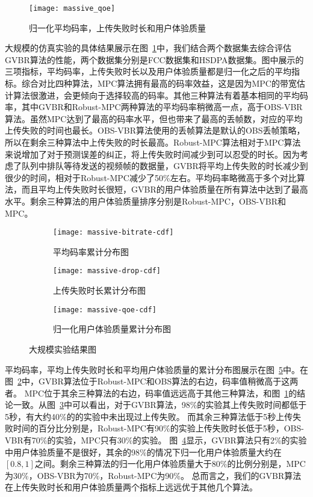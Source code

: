 \begin{figure}[tb]%
  \centering
  \texttt{[image: massive\_qoe]}
  \caption{归一化平均码率，上传失败时长和用户体验质量}
  \label{fig:massive_qoe}
\end{figure}

大规模的仿真实验的具体结果展示在图~\ref{fig:massive_qoe}中，我们结合两个数据集去综合评估GVBR算法的性能，两个数据集分别是FCC数据集和HSDPA数据集。图中展示的三项指标，平均码率，上传失败时长以及用户体验质量都是归一化之后的平均指标。综合对比四种算法，MPC算法拥有最高的码率效益，这是因为MPC的带宽估计算法很激进，会更倾向于选择较高的码率。其他三种算法有着基本相同的平均码率，其中GVBR和Robust-MPC两种算法的平均码率稍微高一点，高于OBS-VBR算法。虽然MPC达到了最高的码率水平，但也带来了最高的丢帧数，对应的平均上传失败的时间也最长。OBS-VBR算法使用的丢帧算法是默认的OBS丢帧策略，所以在剩余三种算法中上传失败的时长最高。Robust-MPC算法相对于MPC算法来说增加了对于预测误差的纠正，将上传失败时间减少到可以忍受的时长。因为考虑了队列中排队等待发送的视频帧的数据量，GVBR将平均上传失败的时长减少到很少的时间，相对于Robust-MPC减少了50\%左右。平均码率略微高于多个对比算法，而且平均上传失败时长很短，GVBR的用户体验质量在所有算法中达到了最高水平。剩余三种算法的用户体验质量排序分别是Robust-MPC，OBS-VBR和MPC。

\begin{figure}[tb]
  \centering%
  \begin{subfigure}{0.48\textwidth}
    \texttt{[image: massive-bitrate-cdf]}
    \caption{平均码率累计分布图}
    \label{fig:bitrate_cdf}
  \end{subfigure}%
  \hfill
  \begin{subfigure}{0.48\textwidth}
    \texttt{[image: massive-drop-cdf]}
    \caption{上传失败时长累计分布图}
    \label{fig:drop_cdf}
  \end{subfigure}
  \vfill
  \vspace{0.2in}
  \begin{subfigure}{0.48\textwidth}
    \texttt{[image: massive-qoe-cdf]}
    \caption{归一化用户体验质量累计分布图}
    \label{fig:qoe_cdf}
  \end{subfigure}
  \vspace{0.1in}
  \caption{大规模实验结果图}
  \label{fig:massive_cdf}
\end{figure}

平均码率，平均上传失败时长和平均用户体验质量的累计分布图展示在图~\ref{fig:massive_cdf}中。在图~\ref{fig:bitrate_cdf}中，GVBR算法位于Robust-MPC和OBS算法的右边，码率值稍微高于这两者。
MPC位于其余三种算法的右边，码率值远远高于其他三种算法，和图~\ref{fig:massive_qoe}的结论一致。从图~\ref{fig:drop_cdf}中可以看出，对于GVBR算法，98\%的实验其上传失败时间都低于5秒，有大约40\%的的实验中未出现过上传失败。
而其余三种算法低于5秒上传失败时间的百分比分别是，Robust-MPC有90\%的实验上传失败时长低于5秒，OBS-VBR有70\%的实验，MPC只有30\%的实验。
图~\ref{fig:qoe_cdf}显示，GVBR算法只有2\%的实验中用户体验质量不是很好，其余的98\%的情况下归一化用户体验质量大约在$[0.8,1]$之间。剩余三种算法的归一化用户体验质量大于80\%的比例分别是，MPC为30\%，OBS-VBR为70\%，Robust-MPC为90\%。
总而言之，我们的GVBR算法在上传失败时长和用户体验质量两个指标上远远优于其他几个算法。

